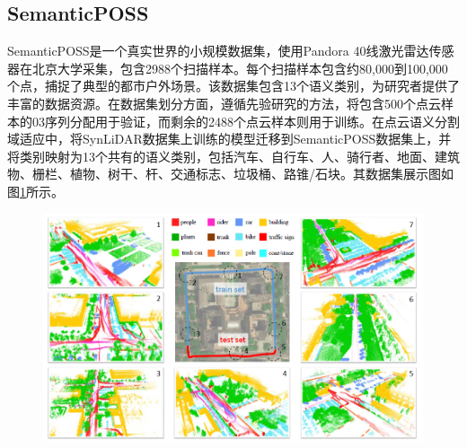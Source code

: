 \subsection{SemanticPOSS}
SemanticPOSS是一个真实世界的小规模数据集，使用Pandora 40线激光雷达传感器在北京大学采集，包含2988个扫描样本。每个扫描样本包含约80,000到100,000个点，捕捉了典型的都市户外场景。该数据集包含13个语义类别，为研究者提供了丰富的数据资源。在数据集划分方面，遵循先验研究的方法，将包含500个点云样本的03序列分配用于验证，而剩余的2488个点云样本则用于训练。在点云语义分割域适应中，将SynLiDAR数据集上训练的模型迁移到SemanticPOSS数据集上，并将类别映射为13个共有的语义类别，包括汽车、自行车、人、骑行者、地面、建筑物、栅栏、植物、树干、杆、交通标志、垃圾桶、路锥/石块。其数据集展示图如图\ref{fig:2-5}所示。
\vspace{-0.1cm}
\begin{figure}[h]
    \centering
    \includegraphics[width = \textwidth, scale=0.5]{ljx/figure/2-5/poss.png}
    \label{fig:2-5}
\end{figure}
\vspace{-0.35cm} 
